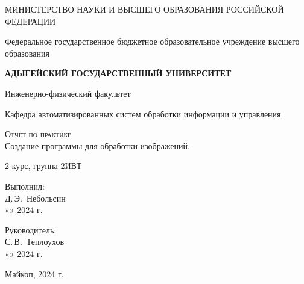 \documentclass[12pt,a4paper]{scrartcl}
\begin{document}
  \begin{titlepage}
    \begin{center}
      \large
      МИНИСТЕРСТВО НАУКИ И ВЫСШЕГО ОБРАЗОВАНИЯ РОССИЙСКОЙ ФЕДЕРАЦИИ
      
      Федеральное государственное бюджетное образовательное учреждение высшего образования
      
      \textbf{АДЫГЕЙСКИЙ ГОСУДАРСТВЕННЫЙ УНИВЕРСИТЕТ}
      \vspace{0.25cm}
      
      Инженерно-физический факультет
      
      Кафедра автоматизированных систем обработки информации и управления
      \vfill

      \vfill
      
      \textsc{Отчет по практике}\\[5mm]
      
      {\LARGE Создание программы для обработки изображений.}
      \bigskip
      
      2 курс, группа 2ИВТ
    \end{center}
    \vfill
    
    \newlength{\ML}
    \hfill\begin{minipage}{0.5\textwidth}
      Выполнил:\\
      \underline{\hspace{\ML}} Д.\,Э.~Небольсин\\
      «\underline{\hspace{0.7cm}}» \underline{\hspace{2cm}} 2024 г.
    \end{minipage}%
    \bigskip
    
    \hfill\begin{minipage}{0.5\textwidth}
      Руководитель:\\
      \underline{\hspace{\ML}} С.\,В.~Теплоухов\\
      «\underline{\hspace{0.7cm}}» \underline{\hspace{2cm}} 2024 г.
    \end{minipage}%
    \vfill
    
    \begin{center}
      Майкоп, 2024 г.
    \end{center}
  \end{titlepage}
\label{sec:intro}
\end{document}
